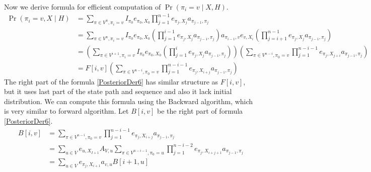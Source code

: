 Now we derive formula for efficient computation of  $\Pr\left(\pi_i=v\mid
X,H\right)$.
\begin{align}
\Pr\left(\pi_i=v,X\mid H\right) &=  
				\sum_{\pi\in
				V^n,\pi_i=v}I_{\pi_0}e_{\pi_0,X_0}\prod_{j=1}^{n-1}e_{\pi_j,X_j}a_{\pi_{j-1},\pi_j}
					\label{PosteriorDer2}\\
				&= \sum_{\pi\in V^n,\pi_i=v}I_{\pi_0}e_{\pi_0,X_0}
				\left( 
					\prod_{j=1}^{i-1} e_{\pi_j,X_j}a_{\pi_{j-1},\pi_j}
				\right)
				a_{\pi_{i-1},v}e_{v,X_i}
				\left(  
					\prod_{j=i+1}^{n-1} e_{\pi_j,X_j}a_{\pi_{j-1},\pi_j}
				\right)
					\label{PosteriorDer4}\\
				&= 
				\left(
					\sum_{\pi\in V^{i+1},\pi_i=v}I_{\pi_0}e_{\pi_0,X_0}
					\left(
						\prod_{j=1}^{i} e_{\pi_j,X_j}a_{\pi_{j-1},\pi_j}
					\right)
				\right)
				\left( 
					\sum_{\pi\in V^{n-i},\pi_0=v}
					\prod_{j=1}^{n-i-1} e_{\pi_j,X_{j+i}}a_{\pi_{j-1},\pi_j}
				\right)
					\label{PosteriorDer5}\\
				&= F[i,v]
				\left( 
					\sum_{\pi\in V^{n-i},\pi_0=v}
					\prod_{j=1}^{n-i-1} e_{\pi_j,X_{i+j}}a_{\pi_{j-1},\pi_j}
				\right)
					\label{PosteriorDer6}
\end{align}
The right part of the formula \ref{PosteriorDer6} has
similar structure as $F[i,v]$, but it uses last part of the state path and
sequence and also it lack initial distribution. We can compute 
this formula using  the Backward algorithm, which is very similar to forward
algorithm. Let $B[i,v]$ be the right part of formula \ref{PosteriorDer6}.
\begin{align}
B[i,v]&=
\sum_{\pi\in V^{n-i},\pi_0=v}
	\prod_{j=1}^{n-i-1}
		e_{\pi_j,X_{i+j}}a_{\pi_{j-1},\pi_j}\\
 &= 
 \sum_{u\in V}
 	e_{u,X_{I+1}}A_{V,u}
	\sum_{\pi\in V^{n-i-1},\pi_0=u}
		\prod_{j=1}^{n-i-2}
			e_{\pi_j,X_{i+j+1}}a_{\pi_{j-1},\pi_j}\\
 &= 
 \sum_{u\in V}
 	e_{\pi_j,X_{i+1}}a_{v,u}B[i+1,u]
\end{align}
